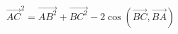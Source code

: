 \documentclass[preview]{standalone}
\begin{document}
\begin{align*}
\overrightarrow{AC}^2 = \overrightarrow{AB^2} +  \overrightarrow{BC^2} -  2\cos\left(\overrightarrow{BC}, \overrightarrow{BA}\right)
\end{align*}
\end{document}
